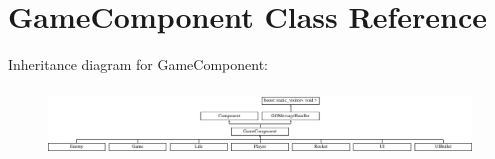 \hypertarget{class_game_component}{}\section{Game\+Component Class Reference}
\label{class_game_component}
Inheritance diagram for Game\+Component\+:\begin{figure}[H]
\begin{center}
\leavevmode
\includegraphics[height=1.839080cm]{class_game_component}
\end{center}
\end{figure}

